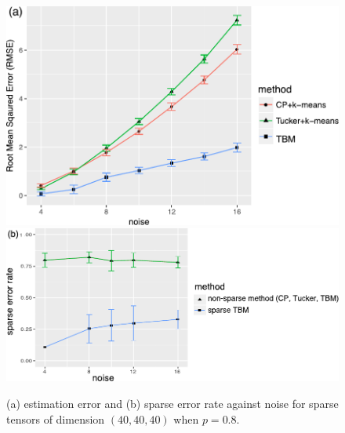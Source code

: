 \documentclass{article}
\begin{document}
\begin{appendices}

		



\begin{figure}[http!]
\begin{center}
\includegraphics[width=.38\textwidth]{figures/clustering_404040_sparse}
\includegraphics[width=.55\textwidth]{figures/clustering_correct_sparse}
\end{center}
\caption{(a) estimation error and (b) sparse error rate against noise for sparse tensors of dimension $(40,40,40)$ when $p=0.8$. }\label{fig:sparse}
\end{figure}



\end{appendices}
\end{document}
